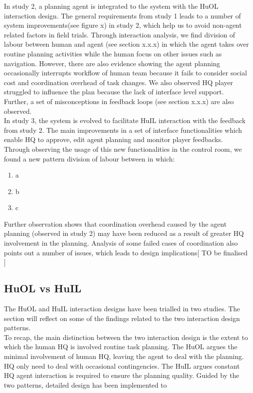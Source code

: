 In study 2, a planning agent is integrated to the system with the HuOL interaction design. The general requirements from study 1 leads to a number of system improvements(see figure x) in study 2, which help us to avoid non-agent related factors in field trials. Through interaction analysis, we find division of labour between human and agent (see section x.x.x) in which the agent takes over routine planning activities while the human focus on other issues such as navigation. However, there are also evidence showing the agent planning occasionally interrupts workflow of human team because it fails to consider social cost and coordination overhead of task changes. We also observed HQ player struggled to influence the plan because the lack of interface level support. Further, a set of misconceptions in feedback loops (see section x.x.x) are also observed.\\

In study 3, the system is evolved to facilitate HuIL interaction with the feedback from study 2. The main improvements in a set of interface functionalities which enable HQ to approve, edit agent planning and monitor player feedbacks. Through observing the usage of this new functionalities in the control room, we found a new pattern division of labour between in which:
	\begin{enumerate}
	 \item a
	 \item b
	 \item c
	\end{enumerate}
	
Further observation shows that coordination overhead caused by the agent planning (observed in study 2) may have been reduced as a result of greater HQ involvement in the planning. Analysis of some failed cases of coordination also points out a number of issues, which leads to design implications[ TO be finalised ]  \\


\subsection{HuOL vs HuIL}
The HuOL and HuIL interaction designs have been trialled in two studies. The section will reflect on some of the findings related to the two interaction design patterns. \\

To recap, the main distinction between the two interaction design is the extent to which the human HQ is involved routine task planning. The HuOL  argues the minimal involvement of human HQ, leaving the agent to deal with the planning. HQ only need to deal with occasional contingencies. The HuIL argues constant HQ agent interaction is required to ensure the planning quality. Guided by the two patterns, detailed design has been implemented to \\

